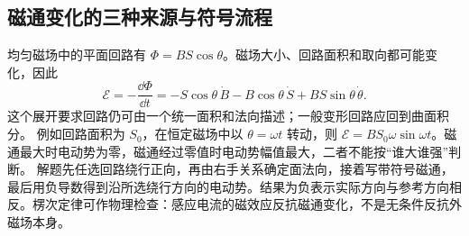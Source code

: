 \subsection{磁通变化的三种来源与符号流程}
均匀磁场中的平面回路有 $\Phi=BS\cos\theta$。磁场大小、回路面积和取向都可能变化，因此
\[
 \mathcal E=-\frac{\dd\Phi}{\dd t}
 =-S\cos\theta\,\dot B-B\cos\theta\,\dot S
 +BS\sin\theta\,\dot\theta.
\]
这个展开要求回路仍可由一个统一面积和法向描述；一般变形回路应回到曲面积分。
例如回路面积为 $S_0$，在恒定磁场中以 $\theta=\omega t$ 转动，则 $\mathcal E=BS_0\omega\sin\omega t$。磁通最大时电动势为零，磁通经过零值时电动势幅值最大，二者不能按“谁大谁强”判断。
解题先任选回路绕行正向，再由右手关系确定面法向，接着写带符号磁通，最后用负导数得到沿所选绕行方向的电动势。结果为负表示实际方向与参考方向相反。楞次定律可作物理检查：感应电流的磁效应反抗磁通变化，不是无条件反抗外磁场本身。

